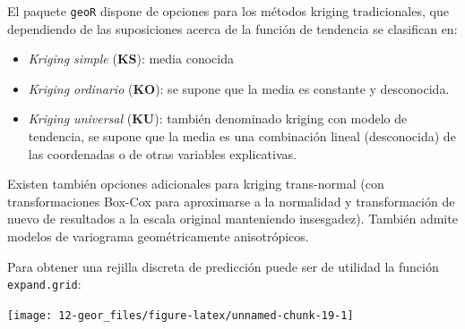 \documentclass[
  spanish,
]{book}
\newenvironment{Shaded}{\begin{snugshade}}{\end{snugshade}}
\newcommand{\AttributeTok}[1]{\textcolor[rgb]{0.77,0.63,0.00}{#1}}
\newcommand{\CommentTok}[1]{\textcolor[rgb]{0.56,0.35,0.01}{\textit{#1}}}
\newcommand{\DecValTok}[1]{\textcolor[rgb]{0.00,0.00,0.81}{#1}}
\newcommand{\FloatTok}[1]{\textcolor[rgb]{0.00,0.00,0.81}{#1}}
\newcommand{\FunctionTok}[1]{\textcolor[rgb]{0.00,0.00,0.00}{#1}}
\newcommand{\NormalTok}[1]{#1}
\newcommand{\OtherTok}[1]{\textcolor[rgb]{0.56,0.35,0.01}{#1}}
\newcommand{\SpecialCharTok}[1]{\textcolor[rgb]{0.00,0.00,0.00}{#1}}
\theoremstyle{break}
\begin{document}
El paquete \texttt{geoR} dispone de opciones para los métodos kriging
tradicionales, que dependiendo de las suposiciones acerca de la función
de tendencia se clasifican en:

\begin{itemize}
\item
  \emph{Kriging simple} (\textbf{KS}): media conocida
\item
  \emph{Kriging ordinario} (\textbf{KO}): se supone que la media es constante
  y desconocida.
\item
  \emph{Kriging universal} (\textbf{KU}): también denominado kriging con modelo de
  tendencia, se supone que la media es una combinación
  lineal (desconocida) de las coordenadas o de otras
  variables explicativas.
\end{itemize}

Existen también opciones adicionales para kriging trans-normal (con
transformaciones Box-Cox para aproximarse a la normalidad y
transformación de nuevo de resultados a la escala original manteniendo
insesgadez). También admite modelos de variograma geométricamente
anisotrópicos.

Para obtener una rejilla discreta de predicción puede ser de utilidad la
función \texttt{expand.grid}:

\begin{Shaded}
\end{Shaded}

\begin{center}\texttt{[image: 12-geor\_files/figure-latex/unnamed-chunk-19-1]} \end{center}
\end{document}
